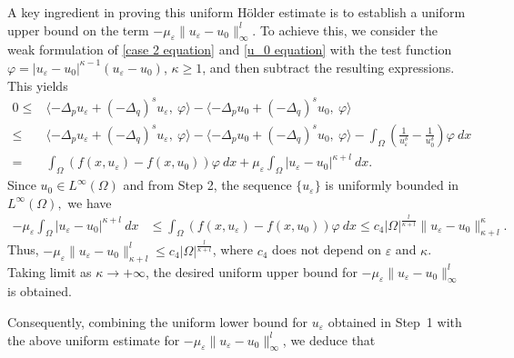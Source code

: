 \documentclass[reqno,oneside]{amsart}
\theoremstyle{definition}
\theoremstyle{remark}
\numberwithin{equation}{section}
\newcommand{\Om} {\Omega}
\newcommand{\p}{\Delta_p}
\newcommand{\qs}{(-\Delta_q)^s}
\newcommand{\rar}{\rightarrow}
\begin{document}
A key ingredient in proving this uniform H\"older estimate is to establish a uniform upper bound on the term $  -\mu_{\varepsilon} \|u_{\varepsilon} - u_0 \|^l_{\infty}.$ To achieve this, we consider the weak formulation of  \eqref{case 2 equation} and \eqref{u_0 equation}  with the test function $\varphi = |u_{\varepsilon} - u_0|^{\kappa -1} (u_{\varepsilon} - u_0)$, $\kappa \geq 1$, and then subtract the resulting expressions. This yields 
\begin{equation*}
    \begin{aligned}
        0 \leq &\langle -\p u_{\varepsilon} + \qs u_{\varepsilon},\ \varphi \rangle - \langle -\p u_0 + \qs u_0,\ \varphi \rangle\\
        \leq & \langle -\p u_{\varepsilon} + \qs u_{\varepsilon},\ \varphi \rangle - \langle -\p u_0 + \qs u_0,\ \varphi \rangle - \int_{\Om} \left(\frac{1}{u_{\varepsilon}^{\delta}} - \frac{1}{u_0^{\delta}} \right) \varphi \ dx\\
        = & \int_{\Om} \left(f(x, u_{\varepsilon}) - f(x, u_0) \right) \varphi \ dx + \mu_{\varepsilon} \int_{\Om} |u_{\varepsilon} - u_0|^{\kappa +l}\ dx.
    \end{aligned}
\end{equation*}
Since $u_0 \in L^{\infty}(\Omega)$ and from Step 2, the sequence $\{u_\varepsilon\}$ is uniformly bounded in $L^{\infty}(\Om),$ we have 
\begin{equation*}
    \begin{aligned}
        - \mu_{\varepsilon} \int_{\Om} |u_{\varepsilon} - u_0|^{\kappa +l}\ dx &\leq \int_{\Om} \left(f(x, u_{\varepsilon}) - f(x, u_0) \right) \varphi \ dx \leq c_4 |\Om|^{\frac{l}{\kappa+l}} \|u_\varepsilon-u_0\|_{\kappa+l}^\kappa.
    \end{aligned}
\end{equation*}
Thus, $- \mu_{\varepsilon} \|u_{\varepsilon} - u_0 \|^{l}_{\kappa+l} \leq c_4 |\Om|^{\frac{l}{\kappa+l}}$, where $c_4$ does not depend on $\varepsilon$ and $\kappa$. Taking limit as $\kappa \rar +\infty$, the desired uniform upper bound for $-\mu_{\varepsilon} \|u_{\varepsilon} - u_0 \|^l_{\infty}$ is obtained.

Consequently, combining the uniform lower bound for \(u_\varepsilon\) obtained in Step~1 with the above uniform estimate for \(-\mu_\varepsilon\|u_\varepsilon - u_0\|_{\infty}^l\), we deduce that
\end{document}
